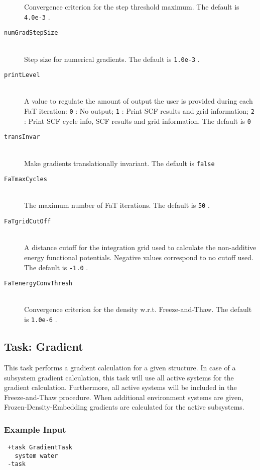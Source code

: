 \documentclass[bibliography=totocnumbered,a4paper,10pt,oneside]{scrbook}
\newcommand{\ttt}[1]{%
  \begingroup\setlength{\fboxsep}{1pt}%
  \colorbox{serenity-green!30}{\texttt{\hspace*{2pt}\vphantom{(g}#1\hspace*{2pt}}}%
  \endgroup
}
\begin{document}
\begin{description}
  Convergence criterion for the step threshold maximum. The default is \ttt{4.0e-3}. 
 \item [\texttt{numGradStepSize}]\hfill \\
  Step size for numerical gradients. The default is \ttt{1.0e-3}. 
 \item [\texttt{printLevel}]\hfill \\
  A value to regulate the amount of output the user is provided during each FaT iteration:
  \ttt{0}: No output; \ttt{1}: Print SCF results and grid information; \ttt{2}: Print SCF cycle info, SCF results and grid information. The default is \ttt{0}
 \item [\texttt{transInvar}]\hfill \\
    Make gradients translationally invariant. The default is \ttt{false}
 \item [\texttt{FaTmaxCycles}]\hfill \\
   The maximum number of FaT iterations. The default is \ttt{50}.
 \item [\texttt{FaTgridCutOff}]\hfill \\
  A distance cutoff for the integration grid used to calculate the non-additive energy functional potentials. Negative values correspond to no cutoff used. The default is \ttt{-1.0}.
 \item [\texttt{FaTenergyConvThresh}]\hfill \\
 Convergence criterion for the density w.r.t. Freeze-and-Thaw. The default is \ttt{1.0e-6}.
\end{description}


\subsection{Task: Gradient}
This task performs a gradient calculation for a given structure. In case of a subsystem gradient calculation, this task will use all active systems for the gradient calculation. Furthermore, all active systems will be included in the Freeze-and-Thaw procedure. When additional environment systems are given, Frozen-Density-Embedding gradients are calculated for the active subsystems.
\subsubsection{Example Input}
\begin{lstlisting}
 +task GradientTask
   system water
 -task
\end{lstlisting}
\end{document}
